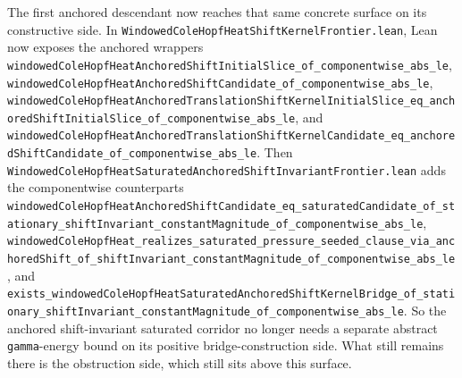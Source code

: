 \documentclass[11pt]{article}
\theoremstyle{remark}
\begin{document}
The first anchored descendant now reaches that same concrete surface on its
constructive side.  In
\texttt{WindowedColeHopfHeatShiftKernelFrontier.lean}, Lean now exposes the
anchored wrappers
\texttt{windowedColeHopfHeatAnchoredShiftInitialSlice\_of\_componentwise\_abs\_le},
\texttt{windowedColeHopfHeatAnchoredShiftCandidate\_of\_componentwise\_abs\_le},
\texttt{windowedColeHopfHeatAnchoredTranslationShiftKernelInitialSlice\_eq\_anchoredShiftInitialSlice\_of\_componentwise\_abs\_le},
and
\texttt{windowedColeHopfHeatAnchoredTranslationShiftKernelCandidate\_eq\_anchoredShiftCandidate\_of\_componentwise\_abs\_le}.
Then \texttt{WindowedColeHopfHeatSaturatedAnchoredShiftInvariantFrontier.lean}
adds the componentwise counterparts
\texttt{windowedColeHopfHeatAnchoredShiftCandidate\_eq\_saturatedCandidate\_of\_stationary\_shiftInvariant\_constantMagnitude\_of\_componentwise\_abs\_le},
\texttt{windowedColeHopfHeat\_realizes\_saturated\_pressure\_seeded\_clause\_via\_anchoredShift\_of\_shiftInvariant\_constantMagnitude\_of\_componentwise\_abs\_le},
and
\texttt{exists\_windowedColeHopfHeatSaturatedAnchoredShiftKernelBridge\_of\_stationary\_shiftInvariant\_constantMagnitude\_of\_componentwise\_abs\_le}.
So the anchored shift-invariant saturated corridor no longer needs a separate
abstract \texttt{gamma}-energy bound on its positive bridge-construction side.
What still remains there is the obstruction side, which still sits above this
surface.
\end{document}
